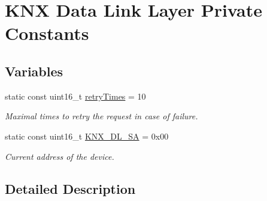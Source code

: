 \hypertarget{group___k_n_x___d_l___private___consts}{}\section{K\+NX Data Link Layer Private Constants}
\label{group___k_n_x___d_l___private___consts}
\subsection*{Variables}
\begin{DoxyCompactItemize}
\item 
static const uint16\+\_\+t \hyperlink{group___k_n_x___d_l___private___consts_gac60d0cbde03099cfdf926cb87ad37206}{retry\+Times} = 10\hypertarget{group___k_n_x___d_l___private___consts_gac60d0cbde03099cfdf926cb87ad37206}{}\label{group___k_n_x___d_l___private___consts_gac60d0cbde03099cfdf926cb87ad37206}

\begin{DoxyCompactList}\small\item\em Maximal times to retry the request in case of failure. \end{DoxyCompactList}\item 
static const uint16\+\_\+t \hyperlink{group___k_n_x___d_l___private___consts_ga2b7e3f895f199cee7da6f73056ad3645}{K\+N\+X\+\_\+\+D\+L\+\_\+\+SA} = 0x00\hypertarget{group___k_n_x___d_l___private___consts_ga2b7e3f895f199cee7da6f73056ad3645}{}\label{group___k_n_x___d_l___private___consts_ga2b7e3f895f199cee7da6f73056ad3645}

\begin{DoxyCompactList}\small\item\em Current address of the device. \end{DoxyCompactList}\end{DoxyCompactItemize}


\subsection{Detailed Description}
